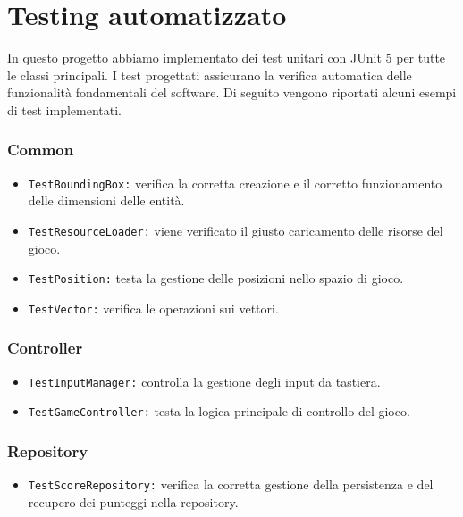 \documentclass[a4paper,12pt]{report}
\begin{document}
\section{Testing automatizzato}
In questo progetto abbiamo implementato dei test unitari con JUnit 5 per tutte le classi principali. I test progettati assicurano la verifica automatica delle funzionalità fondamentali del software. Di seguito vengono riportati alcuni esempi di test implementati.

\subsubsection*{Common}
\begin{itemize}
	\item \texttt{TestBoundingBox:} verifica la corretta creazione e il corretto funzionamento delle dimensioni delle entità.
	\item \texttt{TestResourceLoader:} viene verificato il giusto caricamento delle risorse del gioco.
	\item \texttt{TestPosition:} testa la gestione delle posizioni nello spazio di gioco.
	\item \texttt{TestVector:} verifica le operazioni sui vettori.
\end{itemize}

\subsubsection*{Controller}
\begin{itemize}
	\item \texttt{TestInputManager:} controlla la gestione degli input da tastiera.
	\item \texttt{TestGameController:}  testa la logica principale di controllo del gioco.
\end{itemize}

\subsubsection*{Repository}
\begin{itemize}
	\item \texttt{TestScoreRepository:} verifica la corretta gestione della persistenza e del recupero dei punteggi nella repository.
\end{itemize}

\newpage
\end{document}
